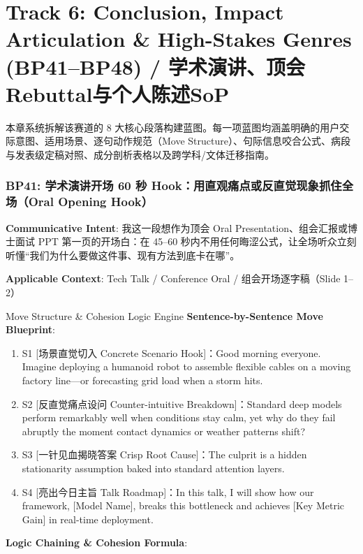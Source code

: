 \chapter{Track 6: Conclusion, Impact Articulation \& High-Stakes Genres (BP41--BP48) / 学术演讲、顶会Rebuttal与个人陈述SoP}\label{ch:track_16}
本章系统拆解该赛道的 8 大核心段落构建蓝图。每一项蓝图均涵盖明确的用户交际意图、适用场景、逐句动作规范（Move Structure）、句际信息咬合公式、病段与发表级定稿对照、成分剖析表格以及跨学科/文体迁移指南。

\subsection{BP41: 学术演讲开场 60 秒 Hook：用直观痛点或反直觉现象抓住全场（Oral Opening Hook）}\label{sec:bp:BP41}
\noindent\textbf{\color{AcadNavy}Communicative Intent}: 我这一段想作为顶会 Oral Presentation、组会汇报或博士面试 PPT 第一页的开场白：在 45--60 秒内不用任何晦涩公式，让全场听众立刻听懂“我们为什么要做这件事、现有方法到底卡在哪”。\par\vspace{2pt}
\noindent\textbf{\color{AcadSlate}Applicable Context}: Tech Talk / Conference Oral / 组会开场逐字稿（Slide 1--2）\par\vspace{4pt}
\begin{ConceptBox}{Move Structure \& Cohesion Logic Engine}
\textbf{Sentence-by-Sentence Move Blueprint}:
\begin{enumerate}[label=\textbf{\color{AcadNavy}S\arabic*.}, leftmargin=2em, itemsep=2pt]
  \item S1 [场景直觉切入 Concrete Scenario Hook]：Good morning everyone. Imagine deploying a humanoid robot to assemble flexible cables on a moving factory line---or forecasting grid load when a storm hits.
  \item S2 [反直觉痛点设问 Counter-intuitive Breakdown]：Standard deep models perform remarkably well when conditions stay calm, yet why do they fail abruptly the moment contact dynamics or weather patterns shift?
  \item S3 [一针见血揭晓答案 Crisp Root Cause]：The culprit is a hidden stationarity assumption baked into standard attention layers.
  \item S4 [亮出今日主旨 Talk Roadmap]：In this talk, I will show how our framework, [Model Name], breaks this bottleneck and achieves [Key Metric Gain] in real-time deployment.
\end{enumerate}\par\vspace{4pt}
\textbf{Logic Chaining \& Cohesion Formula}:\par{}
\end{ConceptBox}

